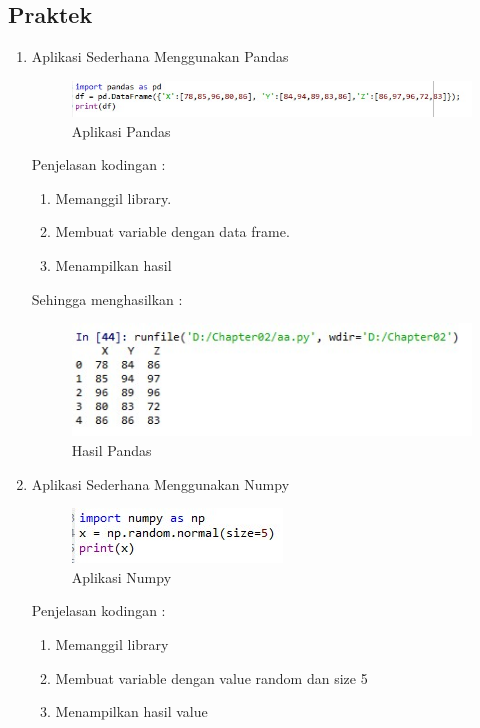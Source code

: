 \subsection{Praktek}
\begin{enumerate}
\item Aplikasi Sederhana Menggunakan Pandas
	\begin{figure}[!hbtp]
	\centering
	\includegraphics[scale=0.5]{figures/k1a.jpg}
	\caption{Aplikasi Pandas}
	\label{contoh}
	\end{figure}
	\par Penjelasan kodingan :
		\begin{enumerate}
		\item Memanggil library.
		\item Membuat variable dengan data frame.
		\item Menampilkan hasil
		\end{enumerate}
	\par Sehingga menghasilkan :
	\begin{figure}[!hbtp]
	\centering
	\includegraphics[scale=0.5]{figures/k1b.jpg}
	\caption{Hasil Pandas}
	\label{contoh}
	\end{figure}
\item Aplikasi Sederhana Menggunakan Numpy
	\begin{figure}[!hbtp]
	\centering
	\includegraphics[scale=0.5]{figures/k2a.jpg}
	\caption{Aplikasi Numpy}
	\label{contoh}
	\end{figure}
	\par Penjelasan kodingan :
		\begin{enumerate}
		\item Memanggil library
		\item Membuat variable dengan value random dan size 5
		\item Menampilkan hasil value

\end{enumerate}
\end{enumerate}
